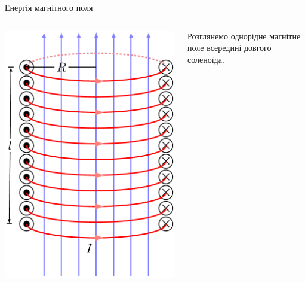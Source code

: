 \documentclass[onlytextwidth]{beamer}
\begin{document}
\begin{frame}{Енергія магнітного поля}{}
\begin{onlyenv}
\begin{block}{}
		\end{block}
		\begin{columns}
			\begin{column}{0.25\linewidth}\centering
				\includegraphics[width=0.75\linewidth]{tikz/Solenoid.pdf}
			\end{column}
			\begin{column}{0.75\linewidth}
				\begin{block}{}
					Розглянемо однорідне магнітне поле всередині довгого соленоїда.\\[1ex]


\end{block}
\end{column}
\end{columns}
\end{onlyenv}
\end{frame}
\end{document}
